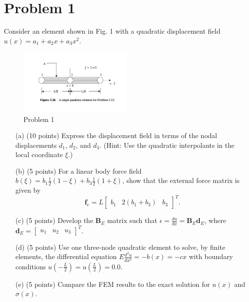 \section*{Problem 1}

Consider an element shown in Fig. 1 with a quadratic displacement field \( u(x) = a_1 + a_2 x + a_3 x^2 \).

\begin{figure}[h!]
    \centering
    \includegraphics[width=0.5\textwidth]{figure_1.png}  %
    \caption{Problem 1}
    \label{fig:element}
\end{figure}

\begin{enumerate}
    \item[(a)] (10 points) Express the displacement field in terms of the nodal displacements \( d_1 \), \( d_2 \), and \( d_3 \). (Hint: Use the quadratic interpolants in the local coordinate \( \xi \).)
    
    \item[(b)] (5 points) For a linear body force field \( b(\xi) = b_1 \frac{1}{2}(1 - \xi) + b_3 \frac{1}{2}(1 + \xi) \), show that the external force matrix is given by 
    \[
    \mathbf{f}_e = L \begin{bmatrix} b_1 & 2(b_1 + b_3) & b_3 \end{bmatrix}^T.
    \]
    
    \item[(c)] (5 points) Develop the \( \mathbf{B}_E \) matrix such that \( \epsilon = \frac{du}{dx} = \mathbf{B}_E \mathbf{d}_E \), where \( \mathbf{d}_E = \begin{bmatrix} u_1 & u_2 & u_3 \end{bmatrix}^T \).
    
    \item[(d)] (5 points) Use one three-node quadratic element to solve, by finite elements, the differential equation \( E \frac{d^2 u}{dx^2} = -b(x) = -c x \) with boundary conditions \( u\left(-\frac{L}{2}\right) = u\left(\frac{L}{2}\right) = 0.0 \).
    
    \item[(e)] (5 points) Compare the FEM results to the exact solution for \( u(x) \) and \( \sigma(x) \).
\end{enumerate}


